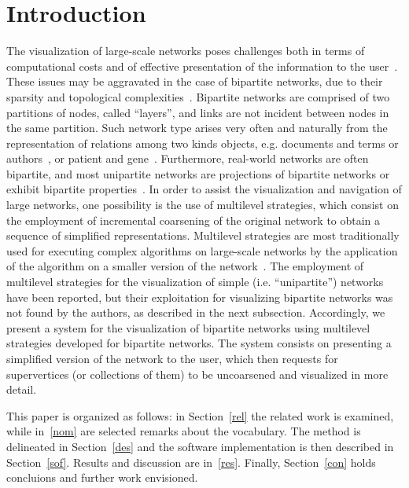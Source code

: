 \documentclass[runningheads]{llncs}
\begin{document}
\section{Introduction}
The visualization of large-scale networks poses challenges both in terms of computational costs
and of effective presentation of the information to the user~\cite{tang,staudt}.
These issues may be aggravated in the case of bipartite networks,
due to their sparsity and topological complexities~\cite{alan1}.
Bipartite networks are comprised of two partitions of nodes,
called ``layers'',
and links are not incident between nodes in the same partition.
Such network type arises very often and naturally from the representation
of relations among two kinds objects,
e.g. documents and terms or authors~\cite{doc,sci,movie}, or patient and gene~\cite{gene}.
Furthermore, real-world networks are often bipartite, and most unipartite networks
are projections of bipartite networks or exhibit bipartite properties~\cite{guillaume0,guillaume}.
In order to assist the visualization and navigation of large networks, one possibility is the use of
multilevel strategies, which consist on the employment of incremental coarsening of the original
network to obtain a sequence of simplified representations.
Multilevel strategies are most traditionally used for executing complex algorithms
on large-scale networks by the application of the algorithm on a smaller
version of the network~\cite{alan2,ml2}.
The employment of multilevel strategies for the visualization of simple (i.e. ``unipartite'')
networks have been reported, but their exploitation for visualizing bipartite networks
was not found by the authors, as described in the next subsection.
Accordingly, we present a system for the visualization of bipartite networks using
multilevel strategies developed for bipartite networks.
The system consists on presenting a simplified version of the network to the user, which then
requests for supervertices (or collections of them) to be uncoarsened and visualized in more detail.

This paper is organized as follows: in Section~\ref{rel} the related work is examined,
while in~\ref{nom} are selected remarks about the vocabulary.
The method is delineated in Section~\ref{des} and
the software implementation is then described in Section~\ref{sof}.
Results and discussion are in~\ref{res}.
Finally, Section~\ref{con} holds concluions and further work envisioned.
\end{document}
